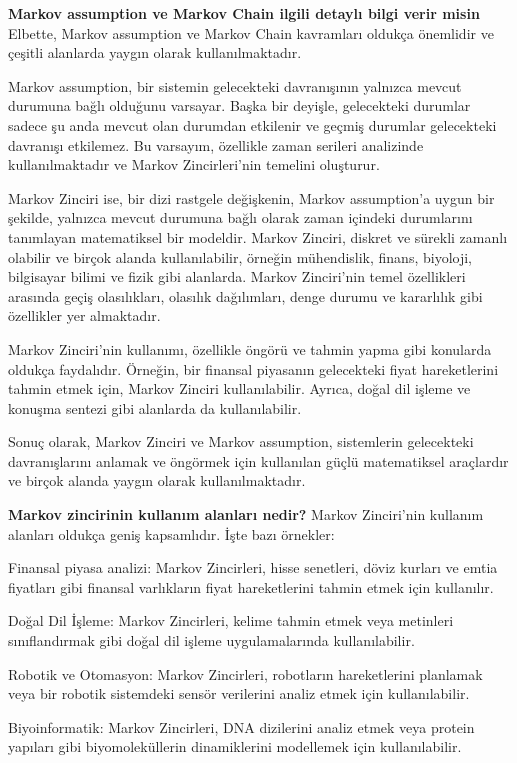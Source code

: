 \documentclass[11pt]{article}
\begin{document}
\textbf{Markov assumption ve Markov Chain ilgili detaylı bilgi verir misin}
Elbette, Markov assumption ve Markov Chain kavramları oldukça önemlidir ve çeşitli alanlarda yaygın olarak kullanılmaktadır.

Markov assumption, bir sistemin gelecekteki davranışının yalnızca mevcut durumuna bağlı olduğunu varsayar. Başka bir deyişle, gelecekteki durumlar sadece şu anda mevcut olan durumdan etkilenir ve geçmiş durumlar gelecekteki davranışı etkilemez. Bu varsayım, özellikle zaman serileri analizinde kullanılmaktadır ve Markov Zincirleri'nin temelini oluşturur.

Markov Zinciri ise, bir dizi rastgele değişkenin, Markov assumption'a uygun bir şekilde, yalnızca mevcut durumuna bağlı olarak zaman içindeki durumlarını tanımlayan matematiksel bir modeldir. Markov Zinciri, diskret ve sürekli zamanlı olabilir ve birçok alanda kullanılabilir, örneğin mühendislik, finans, biyoloji, bilgisayar bilimi ve fizik gibi alanlarda. Markov Zinciri'nin temel özellikleri arasında geçiş olasılıkları, olasılık dağılımları, denge durumu ve kararlılık gibi özellikler yer almaktadır.

Markov Zinciri'nin kullanımı, özellikle öngörü ve tahmin yapma gibi konularda oldukça faydalıdır. Örneğin, bir finansal piyasanın gelecekteki fiyat hareketlerini tahmin etmek için, Markov Zinciri kullanılabilir. Ayrıca, doğal dil işleme ve konuşma sentezi gibi alanlarda da kullanılabilir.

Sonuç olarak, Markov Zinciri ve Markov assumption, sistemlerin gelecekteki davranışlarını anlamak ve öngörmek için kullanılan güçlü matematiksel araçlardır ve birçok alanda yaygın olarak kullanılmaktadır.

\textbf{Markov zincirinin kullanım alanları nedir?}
Markov Zinciri'nin kullanım alanları oldukça geniş kapsamlıdır. İşte bazı örnekler:

Finansal piyasa analizi: Markov Zincirleri, hisse senetleri, döviz kurları ve emtia fiyatları gibi finansal varlıkların fiyat hareketlerini tahmin etmek için kullanılır.

Doğal Dil İşleme: Markov Zincirleri, kelime tahmin etmek veya metinleri sınıflandırmak gibi doğal dil işleme uygulamalarında kullanılabilir.

Robotik ve Otomasyon: Markov Zincirleri, robotların hareketlerini planlamak veya bir robotik sistemdeki sensör verilerini analiz etmek için kullanılabilir.

Biyoinformatik: Markov Zincirleri, DNA dizilerini analiz etmek veya protein yapıları gibi biyomoleküllerin dinamiklerini modellemek için kullanılabilir.
\end{document}
